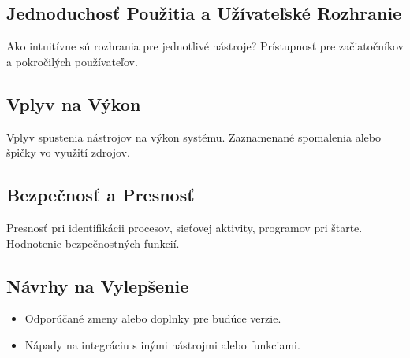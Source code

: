 \documentclass[conference]{IEEEtran}
\begin{document}
\subsection{Jednoduchosť Použitia a Užívateľské Rozhranie}
Ako intuitívne sú rozhrania pre jednotlivé nástroje? Prístupnosť pre začiatočníkov a pokročilých používateľov.

\subsection{Vplyv na Výkon}
Vplyv spustenia nástrojov na výkon systému. Zaznamenané spomalenia alebo špičky vo využití zdrojov.

\subsection{Bezpečnosť a Presnosť}
Presnosť pri identifikácii procesov, sieťovej aktivity, programov pri štarte. Hodnotenie bezpečnostných funkcií.

\subsection{Návrhy na Vylepšenie}
\begin{itemize}
    \item Odporúčané zmeny alebo doplnky pre budúce verzie.
    \item Nápady na integráciu s inými nástrojmi alebo funkciami.
\end{itemize}



\end{document}
